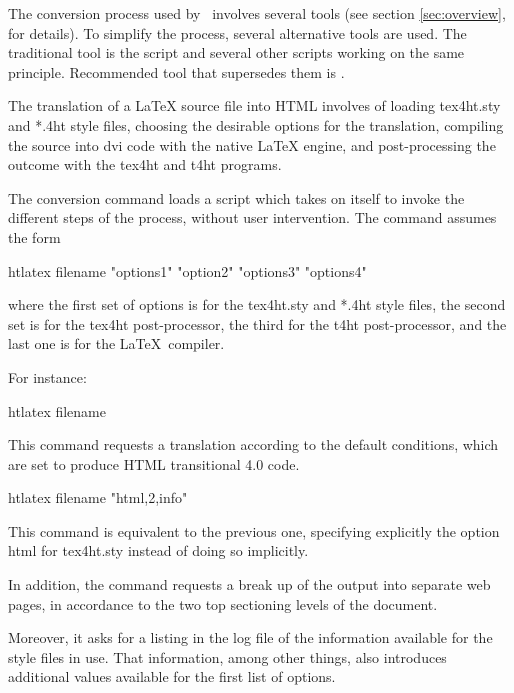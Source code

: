 The conversion process used by \texfourht\ involves several tools
(see section \ref{sec:overview},  for details). To
simplify the process, several alternative tools are used. The traditional tool
is the  script and several other scripts working on the same
principle. Recommended tool that supersedes them is .


The translation of a LaTeX source file into HTML involves of loading tex4ht.sty
and *.4ht style files, choosing the desirable options for the translation,
compiling the source into dvi code with the native LaTeX engine, and
post-processing the outcome with the tex4ht and t4ht programs.

The conversion command loads a script which takes on itself to invoke the
different steps of the process, without user intervention. The command assumes
the form

\begin{shellcommand}
htlatex filename "options1" "option2" "options3" "options4"
\end{shellcommand}

where the first set of options is for the tex4ht.sty and *.4ht style files, the
second set is for the tex4ht post-processor, the third for the t4ht
post-processor, and the last one is for the \LaTeX\ compiler. 


For instance:

\begin{shellcommand}
htlatex filename
\end{shellcommand}

This command requests a translation according to the default conditions, which are set to produce HTML transitional 4.0 code. 

\begin{shellcommand}
htlatex filename "html,2,info"
\end{shellcommand}

This command is equivalent to the previous one, specifying explicitly the option html for tex4ht.sty instead of doing so implicitly.

In addition, the command requests a break up of the output into separate web pages, in accordance to the two top sectioning levels of the document.

Moreover, it asks for a listing in the log file of the information available
for the style files in use. That information, among other things, also
introduces additional values available for the first list of options.

